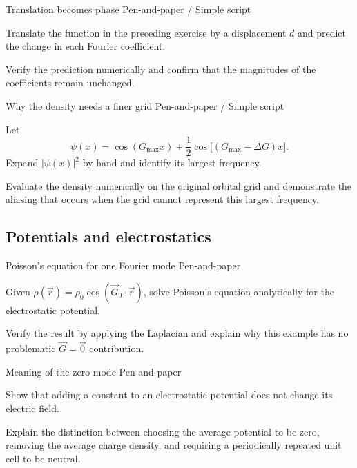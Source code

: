 \begin{exci}{Translation becomes phase \hfill\textnormal{\small Pen-and-paper / Simple script}}
    \item Translate the function in the preceding exercise by a displacement
    $d$ and predict the change in each Fourier coefficient.
    \item Verify the prediction numerically and confirm that the magnitudes of
    the coefficients remain unchanged.
\end{exci}

\begin{exci}{Why the density needs a finer grid \hfill\textnormal{\small Pen-and-paper / Simple script}}
    \item Let
    \begin{equation*}
        \psi(x)=\cos(G_{\max}x)
        +\frac{1}{2}\cos\big[(G_{\max}-\Delta G)x\big].
    \end{equation*}
    Expand $|\psi(x)|^{2}$ by hand and identify its largest frequency.
    \item Evaluate the density numerically on the original orbital grid and
    demonstrate the aliasing that occurs when the grid cannot represent this
    largest frequency.
\end{exci}

%
%
%
\subsection{Potentials and electrostatics}

\begin{exci}{Poisson's equation for one Fourier mode \hfill\textnormal{\small Pen-and-paper}}
    \item Given
    $\rho(\vec{r})=\rho_{0}\cos(\vec{G}_{0}\cdot\vec{r})$, solve Poisson's
    equation analytically for the electrostatic potential.
    \item Verify the result by applying the Laplacian and explain why this
    example has no problematic $\vec{G}=\vec{0}$ contribution.
\end{exci}

\begin{exci}{Meaning of the zero mode \hfill\textnormal{\small Pen-and-paper}}
    \item Show that adding a constant to an electrostatic potential does not
    change its electric field.
    \item Explain the distinction between choosing the average potential to be
    zero, removing the average charge density, and requiring a periodically
    repeated unit cell to be neutral.
\end{exci}

